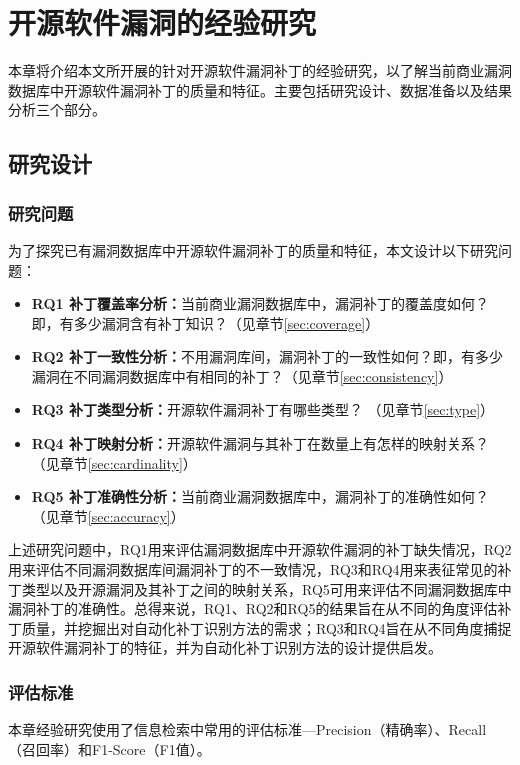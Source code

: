 \chapter{开源软件漏洞的经验研究}\label{sec:study}

本章将介绍本文所开展的针对开源软件漏洞补丁的经验研究，以了解当前商业漏洞数据库中开源软件漏洞补丁的质量和特征。主要包括研究设计、数据准备以及结果分析三个部分。


\section{研究设计}
\subsection{研究问题}
为了探究已有漏洞数据库中开源软件漏洞补丁的质量和特征，本文设计以下研究问题：

\begin{itemize}[leftmargin=*]
    \item \textbf{RQ1 补丁覆盖率分析：}当前商业漏洞数据库中，漏洞补丁的覆盖度如何？即，有多少漏洞含有补丁知识？（见章节\ref{sec:coverage}）
    \item \textbf{RQ2 补丁一致性分析：}不用漏洞库间，漏洞补丁的一致性如何？即，有多少漏洞在不同漏洞数据库中有相同的补丁？（见章节\ref{sec:consistency}）
    \item \textbf{RQ3 补丁类型分析：}开源软件漏洞补丁有哪些类型？ （见章节\ref{sec:type}）
    \item \textbf{RQ4 补丁映射分析：}开源软件漏洞与其补丁在数量上有怎样的映射关系？ （见章节\ref{sec:cardinality}）
    \item \textbf{RQ5 补丁准确性分析：}当前商业漏洞数据库中，漏洞补丁的准确性如何？ （见章节\ref{sec:accuracy}）
\end{itemize}
    
上述研究问题中，RQ1用来评估漏洞数据库中开源软件漏洞的补丁缺失情况，RQ2用来评估不同漏洞数据库间漏洞补丁的不一致情况，RQ3和RQ4用来表征常见的补丁类型以及开源漏洞及其补丁之间的映射关系，RQ5可用来评估不同漏洞数据库中漏洞补丁的准确性。总得来说，RQ1、RQ2和RQ5的结果旨在从不同的角度评估补丁质量，并挖掘出对自动化补丁识别方法的需求；RQ3和RQ4旨在从不同角度捕捉开源软件漏洞补丁的特征，并为自动化补丁识别方法的设计提供启发。

\subsection{评估标准}\label{sec:metric}
本章经验研究使用了信息检索中常用的评估标准---Precision（精确率）、Recall（召回率）和F1-Score（F1值）。

